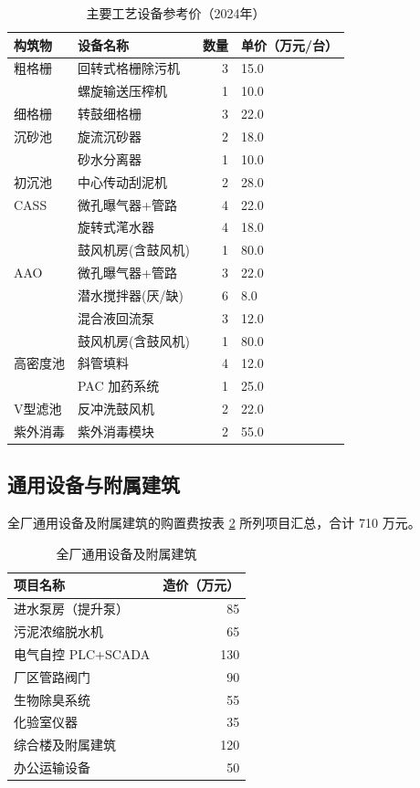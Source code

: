 \documentclass[12pt,a4paper]{ctexart}
\begin{document}
\begin{table}[htbp]
\centering
\caption{主要工艺设备参考价（2024年）}
\label{tab:equip_price}
\small
\begin{tabular}{llrl}
\toprule
\textbf{构筑物} & \textbf{设备名称} & \textbf{数量} & \textbf{单价（万元/台）} \\
\midrule
粗格栅   & 回转式格栅除污机    & 3  & 15.0 \\
         & 螺旋输送压榨机      & 1  & 10.0 \\
细格栅   & 转鼓细格栅          & 3  & 22.0 \\
沉砂池   & 旋流沉砂器          & 2  & 18.0 \\
         & 砂水分离器          & 1  & 10.0 \\
初沉池   & 中心传动刮泥机      & 2  & 28.0 \\
CASS    & 微孔曝气器+管路     & 4  & 22.0 \\
         & 旋转式滗水器        & 4  & 18.0 \\
         & 鼓风机房(含鼓风机)  & 1  & 80.0 \\
AAO     & 微孔曝气器+管路     & 3  & 22.0 \\
         & 潜水搅拌器(厌/缺)   & 6  & 8.0 \\
         & 混合液回流泵        & 3  & 12.0 \\
         & 鼓风机房(含鼓风机)  & 1  & 80.0 \\
高密度池 & 斜管填料            & 4  & 12.0 \\
         & PAC 加药系统       & 1  & 25.0 \\
V型滤池 & 反冲洗鼓风机        & 2  & 22.0 \\
紫外消毒 & 紫外消毒模块        & 2  & 55.0 \\
\bottomrule
\end{tabular}
\end{table}

\subsection{通用设备与附属建筑}

全厂通用设备及附属建筑的购置费按表 \ref{tab:common_equip} 所列项目汇总，合计 710 万元。

\begin{table}[htbp]
\centering
\caption{全厂通用设备及附属建筑}
\label{tab:common_equip}
\begin{tabular}{lr}
\toprule
\textbf{项目名称} & \textbf{造价（万元）} \\
\midrule
进水泵房（提升泵）          & 85 \\
污泥浓缩脱水机              & 65 \\
电气自控 PLC+SCADA          & 130 \\
厂区管路阀门                & 90 \\
生物除臭系统                & 55 \\
化验室仪器                  & 35 \\
综合楼及附属建筑            & 120 \\
办公运输设备                & 50 \\
\bottomrule
\end{tabular}
\end{table}
\end{document}
